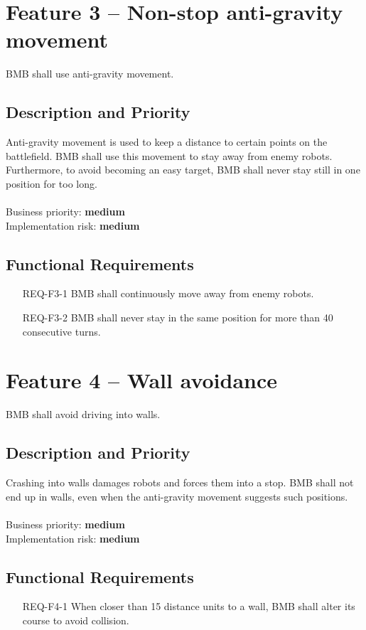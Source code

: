 \documentclass{scrreprt}
\begin{document}
\section{Feature 3 -- Non-stop anti-gravity movement}
BMB shall use anti-gravity movement.
	
\subsection{Description and Priority}
Anti-gravity movement is used to keep a distance to certain points on the battlefield. BMB shall use this movement to stay away from enemy robots. Furthermore, to avoid becoming an easy target, BMB shall never stay still in one position for too long.\\\\Business priority: \textbf{medium}\\
Implementation risk: \textbf{medium}

\subsection{Functional Requirements}
\begin{itemize}
\item[REQ-F3-1] BMB shall continuously move away from enemy robots.
\item[REQ-F3-2] BMB shall never stay in the same position for more than 40 consecutive turns.
\end{itemize}

\section{Feature 4 -- Wall avoidance}
BMB shall avoid driving into walls.

\subsection{Description and Priority}
Crashing into walls damages robots and forces them into a stop. BMB shall not end up in walls, even when the anti-gravity movement suggests such positions.\\\\Business priority: \textbf{medium}\\
Implementation risk: \textbf{medium}

\subsection{Functional Requirements}
\begin{itemize}
\item[REQ-F4-1] When closer than 15 distance units to a wall, BMB shall alter its course to avoid collision.
\end{itemize}
\end{document}

